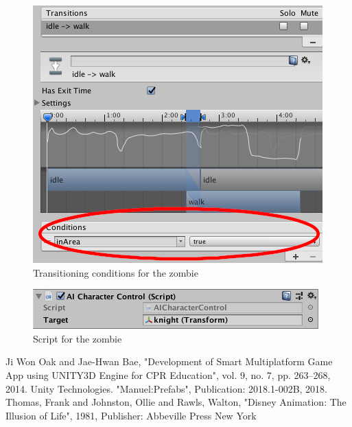 \documentclass[conference]{IEEEtran}
\begin{document}
\begin{figure}[htbp]
  \includegraphics[width=.4\textwidth]{pictures/zombie_transition}
  \caption{Transitioning conditions for the zombie}
  \label{fig:adding_animations_zombie_transition}
\end{figure}

\begin{figure}[htbp]
  \includegraphics[width=.4\textwidth]{pictures/zombie_script}
  \caption{Script for the zombie}
  \label{fig:adding_animations_zombie_script}
\end{figure}


\begin{thebibliography}{00}
 Ji Won Oak and Jae-Hwan Bae, "Development of Smart Multiplatform Game App using UNITY3D Engine for CPR Education", vol. 9, no. 7, pp. 263--268, 2014.
 Unity Technologies. "Manuel:Prefabs", Publication: 2018.1-002B, 2018.
 Thomas, Frank and Johnston, Ollie and Rawls, Walton, "Disney Animation: The Illusion of Life", 1981, Publisher: Abbeville Press New York
\end{thebibliography}
\end{document}
